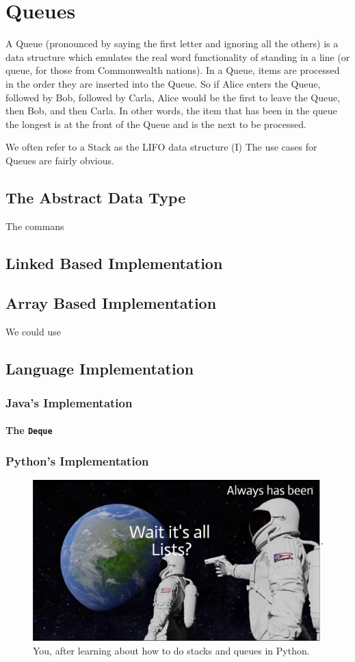 
\chapter{Queues}
\label{chap-queue}

A Queue (pronounced by saying the first letter and ignoring all the others) is a data structure which emulates the real word functionality of standing in a line (or queue, for those from Commonwealth nations).  
In a Queue, items are processed in the order they are inserted into the Queue.  So if Alice enters the Queue, followed by Bob, followed by Carla, Alice would be the first to leave the Queue, then Bob, and then Carla.
In other words, the item that has been in the queue the longest is at the front of the Queue and is the next to be processed.


We often refer to a Stack as the LIFO data structure (I)
The use cases for Queues are fairly obvious.

\section{The Abstract Data Type}
The commans

\section{Linked Based Implementation} 
\section{Array Based Implementation}
We could use 

\section{Language Implementation}
\subsection{Java's Implementation}
\subsubsection{The \texttt{Deque}}

\subsection{Python's Implementation}

\begin{figure}
	\centering
	\includegraphics[width=\linewidth]{pics/waitQueuesAreLists}
	\caption{You, after learning about how to do stacks and queues in Python.}
	\label{fig:waitqueuesarelists}
\end{figure}
